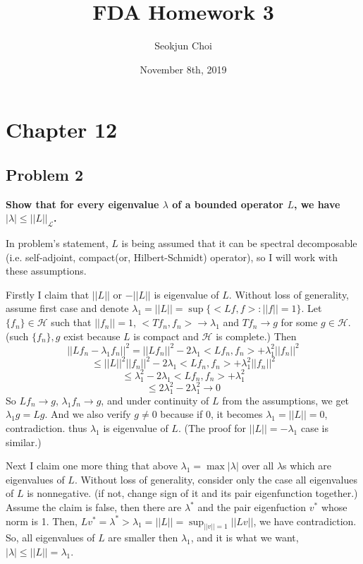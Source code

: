 \documentclass{article}
\begin{document}
\title{FDA Homework 3}
\author{Seokjun Choi}
\date{November 8th, 2019}
\maketitle

\section{Chapter 12}
\subsection{Problem 2}
\textbf{
Show that for every eigenvalue $\lambda$ of a bounded operator $L$,
we have $|\lambda|\leq||L||_{\mathcal{L}}$.
}

In problem's statement, $L$ is being assumed that it can be spectral decomposable 
(i.e. self-adjoint, compact(or, Hilbert-Schmidt) operator), so I will work with these assumptions.

Firstly I claim that $||L||$ or $-||L||$ is eigenvalue of $L$.
Without loss of generality, assume first case and denote $\lambda_1=||L||=\sup\{<Lf,f>:||f||=1\}$.
Let $\{f_n\}\in\mathcal{H}$ such that $||f_n||=1$, $<Tf_n,f_n>\rightarrow\lambda_1$ 
and $Tf_n\rightarrow g$ for some $g\in\mathcal{H}$.
(such $\{f_n\},g$ exist because $L$ is compact and $\mathcal{H}$ is complete.)
Then
\[||Lf_n-\lambda_1 f_n||^2=||Lf_n||^2-2\lambda_1<Lf_n,f_n>+\lambda_1^2||f_n||^2\]
\[\leq ||L||^2||f_n||^2-2\lambda_1<Lf_n,f_n>+\lambda_1^2||f_n||^2\]
\[\leq \lambda_1^2-2\lambda_1<Lf_n,f_n>+\lambda_1^2\]
\[\leq 2\lambda_1^2-2\lambda_1^2\rightarrow 0\]
So $Lf_n\rightarrow g$, $\lambda_1 f_n\rightarrow g$, and under continuity of $L$ from the assumptions,
we get $\lambda_1 g = Lg$. And we also verify $g\neq0$ because if 0, it becomes $\lambda_1=||L||=0$, contradiction.
thus $\lambda_1$ is eigenvalue of $L$.
(The proof for $||L||=-\lambda_1$ case is similar.)

Next I claim one more thing that above $\lambda_1=\max{|\lambda|}$ over all $\lambda$s which are eigenvalues of $L$.
Without loss of generality, consider only the case all eigenvalues of $L$ is nonnegative. 
(if not, change sign of it and its pair eigenfunction together.)
Assume the claim is false, then there are $\lambda^*$ and the pair eigenfuction $v^*$ whose norm is 1.
Then, $Lv^*=\lambda^*>\lambda_1=||L||=\sup_{||v||=1}||Lv||$, we have contradiction.
So, all eigenvalues of $L$ are smaller then $\lambda_1$, and it is what we want,
$|\lambda|\leq||L||=\lambda_1$.
\end{document}
